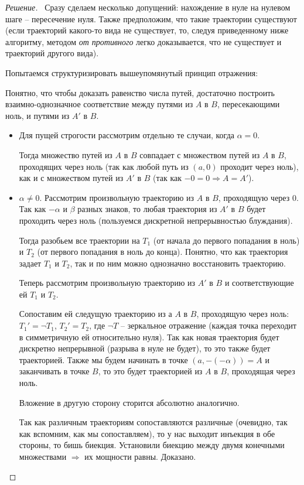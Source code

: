 \documentclass[12pt,a4paper]{extarticle}
\begin{document}
	\begin{proof}[Решение]
		\
			Сразу сделаем несколько допущений: нахождение в нуле на нулевом шаге -- пересечение нуля. Также предположим, что такие траектории существуют (если траекторий какого-то вида не существует, то, следуя приведенному ниже алгоритму, методом \textit{от противного} легко доказывается, что не существует и траекторий другого вида).
			
			\vspace{\baselineskip}
			
			Попытаемся структуризировать вышеупомянутый принцип отражения:
			
			Понятно, что чтобы доказать равенство числа путей, достаточно построить взаимно-однозначное соответствие между путями из $A$ в $B$, пересекающими ноль, и путями из $A'$ в $B$.
			\begin{itemize}
				\item Для пущей строгости рассмотрим отдельно те случаи, когда $\alpha = 0$. 
				
				Тогда множество путей из $A$ в $B$ совпадает с множеством путей из $A$ в $B$, проходящих через ноль (так как любой путь из $(a, 0)$ проходит через ноль), как и с множеством путей из $A'$ в $B$ (так как $-0 = 0 \Rightarrow A = A'$). 
				
				\item $\alpha \neq 0$. Рассмотрим произвольную траекторию из $A$ в $B$, проходящую через 0. Так как $-\alpha$ и $\beta$ разных знаков, то любая траектория из $A'$ в $B$ будет проходить через ноль (пользуемся дискретной непрерывностью блуждания).
				
				Тогда разобьем все траектории на $T_{1}$ (от начала до первого попадания в ноль) и $T_{2}$ (от первого попадания в ноль до конца). Понятно, что как траектория задает $T_1$ и $T_2$, так и по ним можно однозначно восстановить траекторию. 
				
				Теперь рассмотрим произвольную траекторию из $A'$ в $B$ и соответствующие ей $T_1$ и $T_2$.  
				
				Сопоставим ей следущую траекторию из а $A$ в $B$, проходящую через ноль: $T_1' = \neg T_1$, $T_2' = T_2$, где $\neg T$ -- зеркальное отражение (каждая точка переходит в симметричную ей относительно нуля). Так как новая траектория будет дискретно непрерывной (разрыва в нуле не будет), то это также будет траекторией. Также мы будем начинать в точке $(a, -(-\alpha)) = A$ и заканчивать в точке $B$, то это будет траекторией из $A$ в $B$, проходящая через ноль. 
				
				Вложение в другую сторону сторится абсолютно аналогично.
				
				Так как различным траекториям сопоставляются различные (очевидно, так как вспомним, как мы сопоставляем), то у нас выходит инъекция в обе стороны, то бишь биекция. Установили биекцию между двумя конечными множествами $\Rightarrow$ их мощности равны. Доказано. 
			\end{itemize}
		\end{proof}
		
\end{document}
